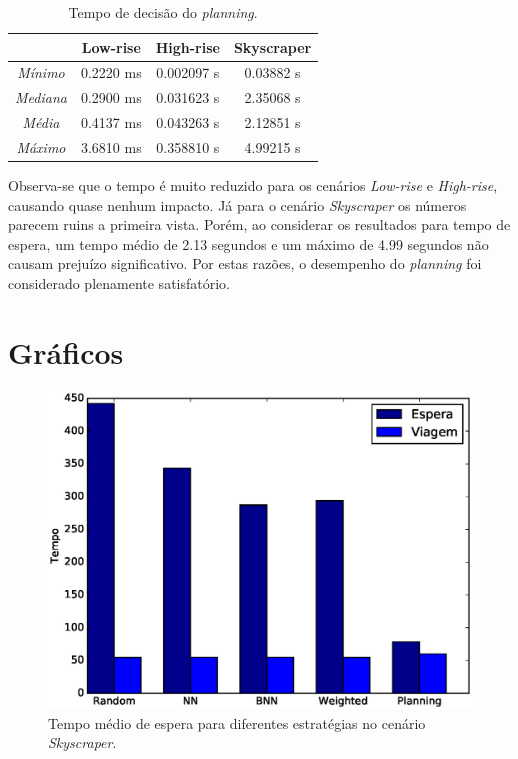 \begin{table}[htb]
\centering
\caption{Tempo de decisão do \textit{planning}.}
\label{table:results:time}
\begin{tabular}{|c|c|c|c|}
\hline
                 & \textbf{Low-rise} & \textbf{High-rise} & \textbf{Skyscraper} \\ \hline
\textit{Mínimo}  & 0.2220 ms         & 0.002097 s         & 0.03882 s           \\ \hline
\textit{Mediana} & 0.2900 ms         & 0.031623 s         & 2.35068 s           \\ \hline
\textit{Média}   & 0.4137 ms         & 0.043263 s         & 2.12851 s           \\ \hline
\textit{Máximo}  & 3.6810 ms         & 0.358810 s         & 4.99215 s           \\ \hline
\end{tabular}
\end{table}

Observa-se que o tempo é muito reduzido para os cenários \textit{Low-rise} e
\textit{High-rise}, causando quase nenhum impacto. Já para o cenário
\textit{Skyscraper} os números parecem ruins a primeira vista. Porém, ao
considerar os resultados para tempo de espera, um tempo médio de 2.13 segundos e
um máximo de 4.99 segundos não causam prejuízo significativo. Por estas razões,
o desempenho do \textit{planning} foi considerado plenamente satisfatório.

\section{Gráficos}

\begin{figure}[htb]
  \centering
  \includegraphics[scale=0.8]{img/skyscraper-average-times-chart}
  \caption[{Tempo médio de espera no cenário \textit{Skyscraper}.}]{Tempo médio de espera para diferentes estratégias no cenário \textit{Skyscraper}.}
  \label{fig:result:average:skyscraper}
\end{figure}

